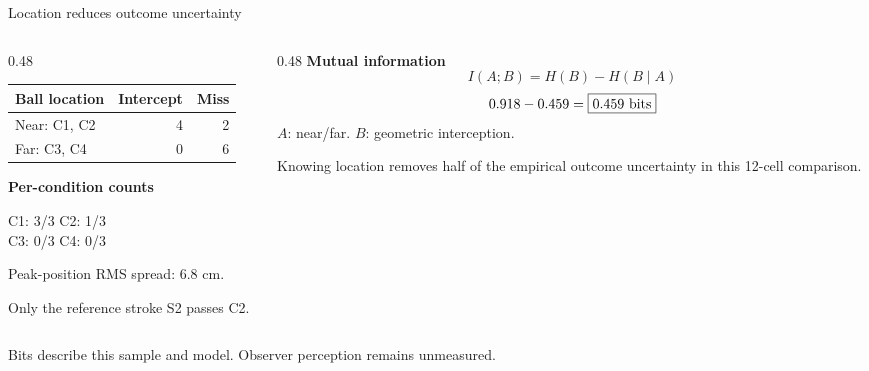\begin{frame}{Location reduces outcome uncertainty}
\begin{columns}[T,onlytextwidth]
\begin{column}{0.48\textwidth}
\centering\small
\begin{tabular}{@{}lrr@{}}\toprule
Ball location & Intercept & Miss\\\midrule
Near: C1, C2 & 4 & 2\\
Far: C3, C4 & 0 & 6\\\bottomrule
\end{tabular}\par
\par\bigskip\raggedright
\textbf{Per-condition counts}\par\par\smallskip
C1: 3/3 \qquad C2: 1/3\\[4pt]
C3: 0/3 \qquad C4: 0/3
\par\medskip
Peak-position RMS spread: 6.8 cm.\par
Only the reference stroke S2 passes C2.
\end{column}
\begin{column}{0.48\textwidth}
\textbf{Mutual information}
\[
I(A;B)=H(B)-H(B\mid A)
\]
\[
0.918-0.459=\boxed{0.459\ {\rm bits}}
\]
\small
$A$: near/far. $B$: geometric interception.\par\par\medskip
Knowing location removes half of the empirical outcome uncertainty in this 12-cell comparison.
\end{column}
\end{columns}
\par\bigskip
\begin{ibox}
Bits describe this sample and model. Observer perception remains unmeasured.
\end{ibox}
\end{frame}
